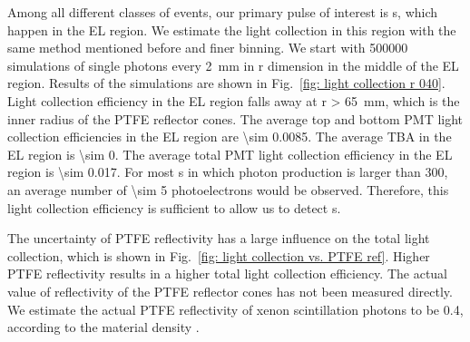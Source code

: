 Among all different classes of events, our primary pulse of interest is \eee s, which happen in the EL region. We estimate the light collection in this region with the same method mentioned before and finer binning. We start with \num{500000} simulations of single photons every \SI{2}{\mm} in r dimension in the middle of the EL region.  Results of the simulations are shown in Fig.~\ref{fig: light collection r 040}. Light collection efficiency in the EL region falls away at r \SI{> 65}{\mm}, which is the inner radius of the PTFE reflector cones. %
The average top and bottom PMT light collection efficiencies in the EL region are \num{\sim 0.0085}. The average TBA in the EL region is \num{\sim 0}. The average total PMT light collection efficiency in the EL region is \num{\sim 0.017}. For most \eee s in which photon production is larger than \num{300}, an average number of \num{\sim 5} photoelectrons would be observed. Therefore, this light collection efficiency is sufficient to allow us to detect \eee s.

The uncertainty of PTFE reflectivity has a large influence on the total light collection, %
which is shown in Fig.~\ref{fig: light collection vs. PTFE ref}. Higher PTFE reflectivity results in a higher total light collection efficiency. The actual value of reflectivity of the PTFE reflector cones has not been measured directly. We estimate the actual PTFE reflectivity of xenon scintillation photons to be \num{0.4}, according to the material density . 

